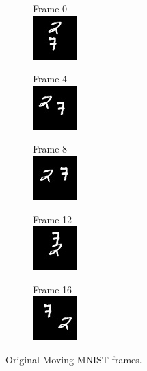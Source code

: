 \begin{subfigure}[t]{0.9\textwidth}
        \centering
        \begin{subfigure}[t]{0.19\textwidth}
            \centering
            \textrm{Frame 0} \medskip \\
            \includegraphics[scale=1]{figures/mnist0/frame0}
        \end{subfigure}
        \hfill
        \begin{subfigure}[t]{0.19\textwidth}
            \centering
            \textrm{Frame 4} \medskip \\
            \includegraphics[scale=1]{figures/mnist0/frame4}
        \end{subfigure}
        \hfill
        \begin{subfigure}[t]{0.19\textwidth}
            \centering
            \textrm{Frame 8} \medskip \\
            \includegraphics[scale=1]{figures/mnist0/frame8}
        \end{subfigure}
        \hfill
        \begin{subfigure}[t]{0.19\textwidth}
            \centering
            \textrm{Frame 12} \medskip \\
            \includegraphics[scale=1]{figures/mnist0/frame12}
        \end{subfigure}
        \hfill
        \begin{subfigure}[t]{0.19\textwidth}
            \centering
            \textrm{Frame 16} \medskip \\
            \includegraphics[scale=1]{figures/mnist0/frame16}
        \end{subfigure}
        \caption{Original Moving-MNIST frames.}
    \end{subfigure}
